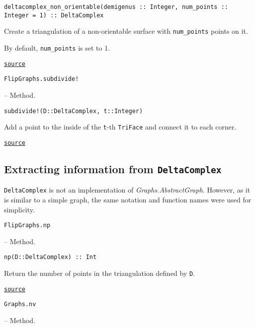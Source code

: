 \begin{adjustwidth}{2em}{0pt}


\begin{verbatim}
deltacomplex_non_orientable(demigenus :: Integer, num_points :: Integer = 1) :: DeltaComplex
\end{verbatim}

Create a triangulation of a non-orientable surface with \texttt{num\_points} points on it. 

By default, \texttt{num\_points} is set to 1.



\href{https://github.com/schto223/FlipGraphs.jl/blob/490c01a7adf74b42f27dda05099165c47ae8133e/src/deltaComplex.jl#L615-L621}{\texttt{source}}


\end{adjustwidth}
\hypertarget{3302743078986330830}{\texttt{FlipGraphs.subdivide!}}  -- {Method.}

\begin{adjustwidth}{2em}{0pt}


\begin{verbatim}
subdivide!(D::DeltaComplex, t::Integer)
\end{verbatim}

Add a point to the inside of the \texttt{t}-th \texttt{TriFace} and connect it to each corner.



\href{https://github.com/schto223/FlipGraphs.jl/blob/490c01a7adf74b42f27dda05099165c47ae8133e/src/deltaComplex.jl#L757-L761}{\texttt{source}}


\end{adjustwidth}

\subsection{Extracting information from \texttt{DeltaComplex}{\textquotesingle}}



\label{14634587330370490614}{}


\texttt{DeltaComplex} is not an implementation of \emph{Graphs.AbstractGraph}. However, as it is similar to a simple graph, the same notation and function names were used for simplicity.


\hypertarget{6458119118606584173}{\texttt{FlipGraphs.np}}  -- {Method.}

\begin{adjustwidth}{2em}{0pt}


\begin{verbatim}
np(D::DeltaComplex) :: Int
\end{verbatim}

Return the number of points in the triangulation defined by \texttt{D}.



\href{https://github.com/schto223/FlipGraphs.jl/blob/490c01a7adf74b42f27dda05099165c47ae8133e/src/deltaComplex.jl#L344-L348}{\texttt{source}}


\end{adjustwidth}
\hypertarget{6570522663719518946}{\texttt{Graphs.nv}}  -- {Method.}

